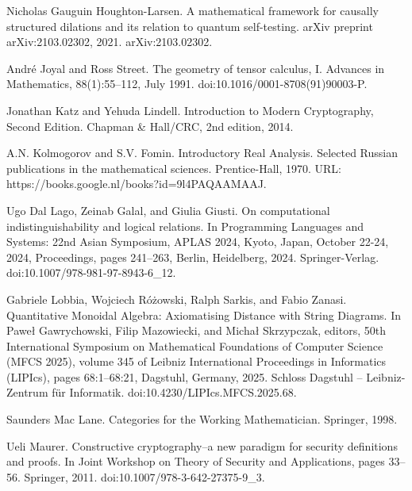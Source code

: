 \documentclass[10pt,a4paper]{article}
\begin{document}
\par\noindent  [12]  Nicholas Gauguin Houghton-Larsen.  A mathematical framework for causally structured dilations and its relation to quantum self-testing.  arXiv preprint arXiv:2103.02302, 2021.  arXiv:2103.02302.  
 
\par\noindent  [13]  André Joyal and Ross Street.  The geometry of tensor calculus, I.  Advances in Mathematics, 88(1):55–112, July 1991.  doi:10.1016/0001-8708(91)90003-P.  
 
\par\noindent  [14]  Jonathan Katz and Yehuda Lindell.  Introduction to Modern Cryptography, Second Edition.  Chapman \& Hall/CRC, 2nd edition, 2014.  
 
\par\noindent  [15]  A.N. Kolmogorov and S.V. Fomin.  Introductory Real Analysis.  Selected Russian publications in the mathematical sciences. Prentice-Hall, 1970.  URL: https://books.google.nl/books?id=9l4PAQAAMAAJ.  
 
\par\noindent  [16]  Ugo Dal Lago, Zeinab Galal, and Giulia Giusti.  On computational indistinguishability and logical relations.  In Programming Languages and Systems: 22nd Asian Symposium, APLAS 2024, Kyoto, Japan, October 22-24, 2024, Proceedings, pages 241–263, Berlin, Heidelberg, 2024. Springer-Verlag.  doi:10.1007/978-981-97-8943-6\_12.  
 
\par\noindent  [17]  Gabriele Lobbia, Wojciech Różowski, Ralph Sarkis, and Fabio Zanasi.  Quantitative Monoidal Algebra: Axiomatising Distance with String Diagrams.  In Paweł Gawrychowski, Filip Mazowiecki, and Michał Skrzypczak, editors, 50th International Symposium on Mathematical Foundations of Computer Science (MFCS 2025), volume 345 of Leibniz International Proceedings in Informatics (LIPIcs), pages 68:1–68:21, Dagstuhl, Germany, 2025. Schloss Dagstuhl – Leibniz-Zentrum für Informatik.  doi:10.4230/LIPIcs.MFCS.2025.68.  
 
\par\noindent  [18]  Saunders Mac Lane.  Categories for the Working Mathematician.  Springer, 1998.  
 
\par\noindent  [19]  Ueli Maurer.  Constructive cryptography–a new paradigm for security definitions and proofs.  In Joint Workshop on Theory of Security and Applications, pages 33–56. Springer, 2011.  doi:10.1007/978-3-642-27375-9\_3.  
 
\end{document}
